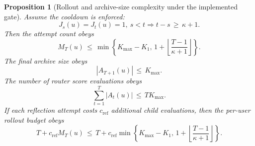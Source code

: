 \documentclass{article} %
\newtheorem{proposition}[theorem]{Proposition}
\begin{document}
\begin{proposition}[Rollout and archive-size complexity under the implemented gate]
Assume the cooldown is enforced:
\begin{equation}
\label{eq:app-third-rollout-cooldown}
J_s(u)=J_t(u)=1,\ s<t
\Rightarrow
t-s
\,\ge\,
\kappa+1.
\end{equation}
Then the attempt count obeys
\begin{equation}
\label{eq:app-third-rollout-m-bound}
M_T(u)
\,\le\,
\min\!\left\{
K_{\max}-K_1,\,
1+\left\lfloor\frac{T-1}{\kappa+1}\right\rfloor
\right\}.
\end{equation}
The final archive size obeys
\begin{equation}
\label{eq:app-third-rollout-archive-bound}
|A_{T+1}(u)|
\,\le\,
K_{\max}.
\end{equation}
The number of router score evaluations obeys
\begin{equation}
\label{eq:app-third-rollout-score-bound}
\sum_{t=1}^{T}
|A_t(u)|
\,\le\,
T K_{\max}.
\end{equation}
If each reflection attempt costs \(c_{\mathrm{ref}}\) additional child evaluations, then the per-user rollout budget obeys
\begin{equation}
\label{eq:app-third-rollout-budget-bound}
T+c_{\mathrm{ref}}M_T(u)
\,\le\,
T
+
c_{\mathrm{ref}}
\min\!\left\{
K_{\max}-K_1,\,
1+\left\lfloor\frac{T-1}{\kappa+1}\right\rfloor
\right\}.
\end{equation}
\end{proposition}
\end{document}
